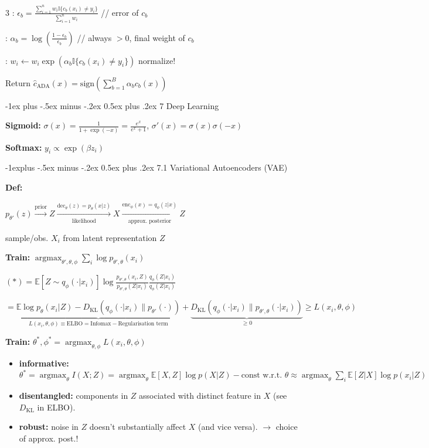 \documentclass[10pt,landscape,a4paper]{article}
\makeatletter
\renewcommand{\section}{\@startsection{section}{1}{0mm}%
                                {-1ex plus -.5ex minus -.2ex}%
                                {0.5ex plus .2ex}%
                                {\normalfont\large\bfseries}}
\renewcommand{\subsection}{\@startsection{subsection}{2}{0mm}%
                                {-1explus -.5ex minus -.2ex}%
                                {0.5ex plus .2ex}%
                                {\normalfont\normalsize\bfseries}}
\newcommand{\E}{\mathbb{E}}
\DeclareMathOperator*{\argmax}{argmax}
\makeatother
\begin{document}
\begin{multicols}{3}
\quad [Eval]: $\epsilon_b = \frac{\sum_{i=1}^n w_i \mathbb{I}\{c_b(x_i) \neq y_i\}}{\sum_{i=1}^n w_i}$ // error of $c_b$

\quad [Update]: $\alpha_b = \log(\frac{1-\epsilon_b}{\epsilon_b})$ // always $>0$, final weight of $c_b$

\quad [Reweight]: $w_i \leftarrow w_i \exp(\alpha_b \mathbb{I}\{c_b(x_i) \neq y_i\})$ normalize!

Return $\hat{c}_{\text{ADA}}(x) = \text{sign}(\sum_{b=1}^B \alpha_b c_b(x))$

\section{7 Deep Learning}

\textbf{Sigmoid:} $\sigma(x) = \frac{1}{1+\exp(-x)} = \frac{e^x}{e^x+1}$, $\sigma'(x) = \sigma(x)\sigma(-x)$

\textbf{Softmax:} $y_i \propto \exp(\beta z_i)$

\subsection{7.1 Variational Autoencoders (VAE)}

\textbf{Def:}

$p_{\theta'}(z) \xrightarrow{\text{prior}} Z \xrightarrow[\text{likelihood}]{\text{dec}_\theta(z) = p_\theta(x|z)} X \xrightarrow[\text{approx. posterior}]{\text{enc}_\phi(x) = q_\phi(z|x)} Z$

sample/obs. $X_i$ from latent representation $Z$

\textbf{Train:} $\argmax_{\theta',\theta,\phi} \sum_i \log p_{\theta',\theta}(x_i)$

$(*) = \E[Z \sim q_\phi(\cdot|x_i)]{\log \frac{p_{\theta',\theta}(x_i, Z)}{p_{\theta',\theta}(Z|x_i)} \frac{q_\phi(Z|x_i)}{q_\phi(Z|x_i)}}$

$= \underbrace{\E{\log p_\theta(x_i|Z)} - D_{\text{KL}}(q_\phi(\cdot|x_i) \| p_{\theta'}(\cdot))}_{L(x_i,\theta,\phi) \equiv \text{ELBO} = \text{Infomax} - \text{Regularisation term}} + \underbrace{D_{\text{KL}}(q_\phi(\cdot|x_i) \| p_{\theta',\theta}(\cdot|x_i))}_{\geq 0} \geq L(x_i,\theta,\phi)$

\textbf{Train:} $\theta^*, \phi^* = \argmax_{\theta,\phi} L(x_i, \theta, \phi)$

\begin{itemize}[leftmargin=*]
\item \textbf{informative:} $\theta^* = \argmax_\theta I(X;Z) = \argmax_\theta \E[X,Z]{\log p(X|Z)} - \text{const w.r.t. } \theta \approx \argmax_\theta \sum_i \E[Z|X]{\log p(x_i|Z)}$
\item \textbf{disentangled:} components in $Z$ associated with distinct feature in $X$ (see $D_{\text{KL}}$ in ELBO).
\item \textbf{robust:} noise in $Z$ doesn't substantially affect $X$ (and vice versa). $\to$ choice of approx. post.!
\end{itemize}


\end{multicols}
\end{document}
